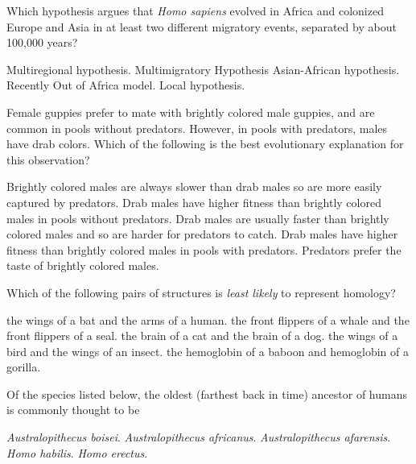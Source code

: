 \question
Which hypothesis argues that \textit{Homo sapiens} evolved in Africa and colonized Europe and Asia in at least two different migratory events, separated by about 100,000 years?

\begin{choices}
\choice Multiregional hypothesis.
\choice Multimigratory Hypothesis
\choice Asian-African hypothesis.
\correctchoice Recently Out of Africa model.
\choice Local hypothesis.
\end{choices}

\newpage

\question
Female guppies prefer to mate with brightly colored male guppies, and are common in pools without predators. However, in pools with predators, males have drab colors. Which of the following is the best evolutionary explanation for this observation?

\begin{choices}
\choice Brightly colored males are always slower than drab males so are more easily captured by predators.
\choice Drab males have higher fitness than brightly colored males in pools without predators.
\choice Drab males are usually faster than brightly colored males and so are harder for predators to catch.
\correctchoice Drab males have higher fitness than brightly colored males in pools with predators.
\choice Predators prefer the taste of brightly colored males.
\end{choices}

\question
Which of the following pairs of structures is \textit{least likely} to represent homology?

\begin{choices}
\choice the wings of a bat and the arms of a human.
\choice the front flippers of a whale and the front flippers of a seal.
\choice the brain of a cat and the brain of a dog.
\correctchoice the wings of a bird and the wings of an insect.
\choice the hemoglobin of a baboon and hemoglobin of a gorilla.
\end{choices}

\question
Of the species listed below, the oldest (farthest back in time) ancestor of humans is commonly thought to be

\begin{choices}
\choice \textit{Australopithecus boisei}.
\choice \textit{Australopithecus africanus}.
\correctchoice \textit{Australopithecus afarensis}.
\choice \textit{Homo habilis}.
\choice \textit{Homo erectus}.
\end{choices}
